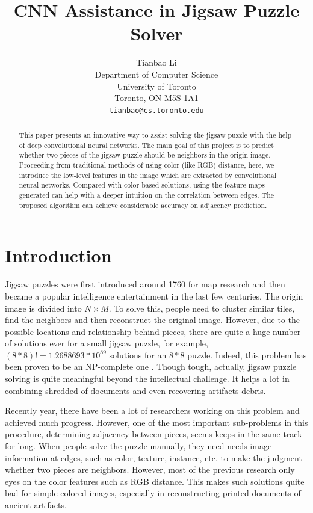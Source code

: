 \documentclass{article}
\title{CNN Assistance in Jigsaw Puzzle Solver}
\author{Tianbao Li\\
  Department of Computer Science\\
  University of Toronto\\
  Toronto, ON M5S 1A1 \\
  \texttt{tianbao@cs.toronto.edu} \\
}
\begin{document}

\maketitle

\begin{abstract}

This paper presents an innovative way to assist solving the jigsaw puzzle with the help of deep convolutional neural networks. The main goal of this project is to predict whether two pieces of the jigsaw puzzle should be neighbors in the origin image. Proceeding from traditional methods of using color (like RGB) distance, here, we introduce the low-level features in the image which are extracted by convolutional neural networks. Compared with color-based solutions, using the feature maps generated can help with a deeper intuition on the correlation between edges. The proposed algorithm can achieve considerable accuracy on adjacency prediction.

\end{abstract}

\section{Introduction}

Jigsaw puzzles were first introduced around 1760 for map research and then became a popular intelligence entertainment \cite{freeman1964apictorial} in the last few centuries. The origin image is divided into $N\times M$. To solve this, people need to cluster similar tiles, find the neighbors and then reconstruct the original image. However, due to the possible locations and relationship behind pieces, there are quite a huge number of solutions ever for a small jigsaw puzzle, for example, $(8*8)!=1.2688693*10^{89}$ solutions for an $8*8$ puzzle. Indeed, this problem has been proven to be an NP-complete one \cite{altman1989solving,demaine2007jigsaw}. Though tough, actually, jigsaw puzzle solving is quite meaningful beyond the intellectual challenge. It helps a lot in combining shredded of documents \cite{levin1975computer,marques2009reconstructing} and even recovering artifacts debris\cite{koller2006computer}.

Recently year, there have been a lot of researchers working on this problem and achieved much progress. However, one of the most important sub-problems in this procedure, determining adjacency between pieces, seems keeps in the same track for long. When people solve the puzzle manually, they need needs image information at edges, such as color, texture, instance, etc. to make the judgment whether two pieces are neighbors. However, most of the previous research only eyes on the color features such as RGB distance. This makes such solutions quite bad for simple-colored images, especially in reconstructing printed documents of ancient artifacts.
\end{document}
